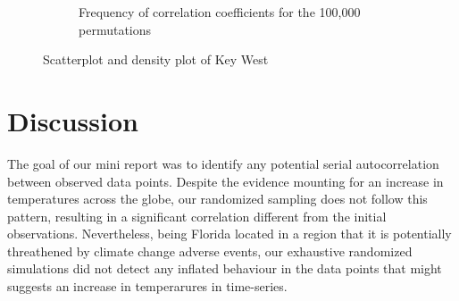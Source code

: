 \documentclass[12pt]{article}
\begin{document}
\begin{figure}[H]
\begin{subfigure}{.45\textwidth}
        \caption{Frequency of correlation coefficients for the 100,000 permutations}
        \label{fig:sub2}
      \end{subfigure}
      \caption{Scatterplot and density plot of Key West}
      \label{fig:test}
    \end{figure}


  \section{Discussion}

  The goal of our mini report was to identify any potential serial autocorrelation between observed data points.
  Despite the evidence mounting for an increase in temperatures across the globe, our randomized sampling does not follow this pattern, resulting in a significant correlation different from the initial observations.
  Nevertheless, being Florida located in a region that it is potentially threathened by climate change adverse events, our exhaustive randomized simulations did not detect any inflated behaviour in the data points that might suggests an increase in temperarures in time-series.


  
  
   
\end{document}
